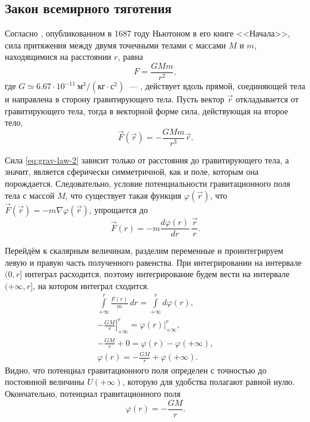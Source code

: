 \subsection{Закон всемирного тяготения}
Согласно , опубликованном в 1687 году Ньютоном в его книге <<Начала>>, сила притяжения между двумя точечными телами с массами $M$ и $m$, находящимися на расстоянии $r$, равна
\begin{equation}
	F=\frac{GMm}{r^2}, 
	\label{eq:grav-law-1}
\end{equation}\nopagebreak где $G\simeq 6.67\cdot 10^{-11}~\text{м}^3 /\left( \text{кг} \cdot \text{с}^2 \right)$~---  , действует вдоль прямой, соединяющей тела и направлена в сторону гравитирующего тела. Пусть вектор $\vec r$ откладывается от гравитирующего тела, тогда в векторной форме сила, действующая на второе тело,
\begin{equation*}
	\vec F (\vec r) = -\frac{GMm}{r^3} \vec r. 
	\label{eq:grav-law-2}
\end{equation*}

Сила \eqref{eq:grav-law-2} зависит только от расстояния до гравитирующего тела, а значит, является сферически симметричной, как и поле, которым она порождается. Следовательно, условие потенциальности гравитационного поля тела с массой $M$, что существует такая функция $\varphi(\vec r)$, что $\vec F (\vec r) = - m \nabla \varphi(\vec r)$, упрощается до 
\begin{equation*}
	\vec F (r) = -m \frac{d\varphi(r)}{dr} \, \frac{\vec{r}}{r}.
\end{equation*} 

Перейдём к скалярным величинам, разделим переменные и проинтегрируем левую и правую часть полученного равенства. При интегрировании на интервале $(0, r]$ интеграл расходится, поэтому интегрирование будем вести на интервале $(+\infty, r]$, на котором интеграл сходится.
\begin{gather*}
	\int\limits_{+\infty}^{r} \frac{ F(r) }{m}\, dr = \int\limits_{+\infty}^{r} d\varphi(r),\\
	-\left.\frac{GM}{r}\right|_{+\infty}^r = \varphi(r)|_{+\infty}^r,\\
	-\frac{GM}{r} + 0 = \varphi(r) - \varphi(+\infty),\\
	\varphi(r) = -\frac{GM}{r} + \varphi(+\infty).
\end{gather*} 
Видно, что потенциал гравитационного поля определен с точностью до постоянной величины $U(+\infty)$, которую для удобства полагают равной нулю. Окончательно, потенциал гравитационного поля
\begin{equation}
	\varphi(r) = -\frac{GM}{r}.
\end{equation}

